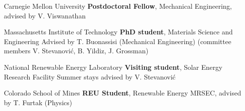 \vspace{-1mm}
	{Carnegie Mellon University}
	{\textbf{Postdoctoral Fellow}, Mechanical Engineering, advised by V. Viswanathan}
        {}

\vspace{\edsep}
	{Massachusetts Institute of Technology}
	{\textbf{PhD student}, Materials Science and Engineering}
    {Advised by T. Buonassisi (Mechanical Engineering) (committee members V. Stevanovi\'c, B. Yildiz, J. Grossman)}

\vspace{\edsep}
    {National Renewable Energy Laboratory}
    {\textbf{Visiting student}, Solar Energy Research Facility}
    {Summer stays advised by V. Stevanovi\'c}

\vspace{\edsep}
    {Colorado School of Mines}
    {\textbf{REU Student}, Renewable Energy MRSEC, advised by T. Furtak (Physics)}{}
